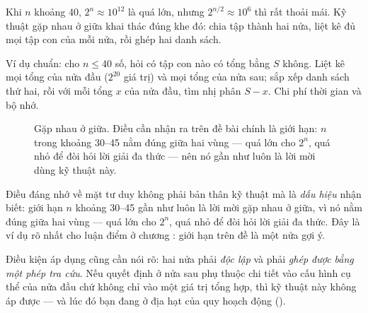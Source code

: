 \documentclass[../../algorithm.tex]{subfiles}
\begin{document}
Khi \(n\) khoảng 40, \(2^n \approx 10^{12}\) là quá lớn, nhưng \(2^{n/2} \approx 10^6\) thì rất thoải mái. Kỹ thuật gặp nhau ở giữa khai thác đúng khe đó: chia tập thành hai nửa, liệt kê đủ mọi tập con của mỗi nửa, rồi ghép hai danh sách.

Ví dụ chuẩn: cho \(n \le 40\) số, hỏi có tập con nào có tổng bằng \(S\) không. Liệt kê mọi tổng của nửa đầu (\(2^{20}\) giá trị) và mọi tổng của nửa sau; sắp xếp danh sách thứ hai, rồi với mỗi tổng \(x\) của nửa đầu, tìm nhị phân \(S-x\). Chi phí  thời gian và  bộ nhớ.

\begin{figure}[H]\centering
{}
\caption{Gặp nhau ở giữa. Điều cần nhận ra trên đề bài chính là giới hạn: \(n\) trong khoảng 30--45 nằm đúng giữa hai vùng --- quá lớn cho \(2^n\), quá nhỏ để đòi hỏi lời giải đa thức --- nên nó gần như luôn là lời mời dùng kỹ thuật này.}
\label{fig:mitm}
\end{figure}

Điều đáng nhớ về mặt tư duy không phải bản thân kỹ thuật mà là \emph{dấu hiệu} nhận biết: giới hạn \(n\) khoảng 30--45 gần như luôn là lời mời gặp nhau ở giữa, vì nó nằm đúng giữa hai vùng --- quá lớn cho \(2^n\), quá nhỏ để đòi hỏi lời giải đa thức. Đây là ví dụ rõ nhất cho luận điểm ở chương : giới hạn trên đề là một nửa gợi ý.

Điều kiện áp dụng cũng cần nói rõ: hai nửa phải \emph{độc lập} và phải \emph{ghép được bằng một phép tra cứu}. Nếu quyết định ở nửa sau phụ thuộc chi tiết vào cấu hình cụ thể của nửa đầu chứ không chỉ vào một giá trị tổng hợp, thì kỹ thuật này không áp được --- và lúc đó bạn đang ở địa hạt của quy hoạch động ().
\end{document}
